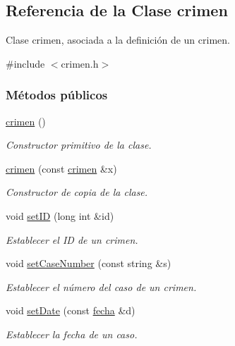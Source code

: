 \hypertarget{classcrimen}{}\subsection{Referencia de la Clase crimen}
\label{classcrimen}


Clase crimen, asociada a la definición de un crimen.  




{\ttfamily \#include $<$crimen.\+h$>$}

\subsubsection*{Métodos públicos}
\begin{DoxyCompactItemize}
\item 
\hyperlink{classcrimen_ab1147e36869c7e635699e4ef746a7555}{crimen} ()
\begin{DoxyCompactList}\small\item\em Constructor primitivo de la clase. \end{DoxyCompactList}\item 
\hyperlink{classcrimen_a50b783e821c2f5bc829eceb9048c12d7}{crimen} (const \hyperlink{classcrimen}{crimen} \&x)
\begin{DoxyCompactList}\small\item\em Constructor de copia de la clase. \end{DoxyCompactList}\item 
void \hyperlink{classcrimen_a2675734f5049f41b5fb5dbc4778df7f8}{set\+I\+D} (long int \&id)
\begin{DoxyCompactList}\small\item\em Establecer el I\+D de un crimen. \end{DoxyCompactList}\item 
void \hyperlink{classcrimen_a98ee8c42a0ec09c704c5f17e812a6bd5}{set\+Case\+Number} (const string \&s)
\begin{DoxyCompactList}\small\item\em Establecer el número del caso de un crimen. \end{DoxyCompactList}\item 
void \hyperlink{classcrimen_ac308c139bb8b599a7badbecd91bfbc5a}{set\+Date} (const \hyperlink{classfecha}{fecha} \&d)
\begin{DoxyCompactList}\small\item\em Establecer la fecha de un caso. \end{DoxyCompactList}\item 

\end{DoxyCompactItemize}
